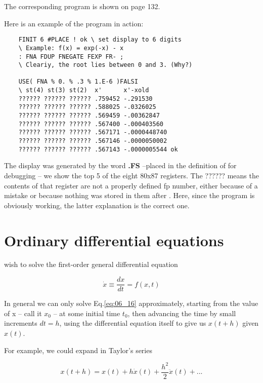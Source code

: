 The corresponding program is shown on page 132.

Here is an example of the program in action:

\begin{lstlisting}
    FINIT 6 #PLACE ! ok \ set display to 6 digits
    \ Example: f(x) = exp(-x) - x
    : FNA FDUP FNEGATE FEXP FR- ;
    \ Cleariy, the root lies between 0 and 3. (Why?)

    USE( FNA % 0. % .3 % 1.E-6 )FALSI
    \ st(4) st(3) st(2)  x'      x'-xold
    ?????? ?????? ?????? .759452 -.291530
    ?????? ?????? ?????? .588025 -.0326025
    ?????? ?????? ?????? .569459 -.00362847
    ?????? ?????? ?????? .567400 -.000403560
    ?????? ?????? ?????? .567171 -.0000448740
    ?????? ?????? ?????? .567146 -.0000050002
    ?????? ?????? ?????? .567143 -.0000005544 ok
\end{lstlisting}

The display was generated by the word \textbf{.FS} --placed in the definition of  for debugging -- we show the top 5 of the eight 80x87 registers. The ?????? means the contents of that register are not a properly defined fp number, either because of a mistake or because nothing was stored in them after . Here, since the program is obviously working, the latter explanation is the correct one.

\section{Ordinary differential equations}
 wish to solve the first-order general differential equation

\begin{equation}
    \dot{x} \equiv \frac{dx}{dt} = f(x,t)
    \label{eq:06_16} 
\end{equation}

In general we can only solve Eq.\ref{eq:06_16} approximately, starting from the value of x -- call it $x_0$ -- at some initial time $t_0$, then advancing the time by small increments $dt = h$, using the differential equation itself to give us $x(t+h)$ given $x(t)$.

For example, we could expand in Taylor's series

\begin{equation}
    x(t+h) = x(t) + h\dot{x}(t) + \frac{h^2}{2}\ddot{x}(t) + ...
    \label{eq:06_17} 
\end{equation}

